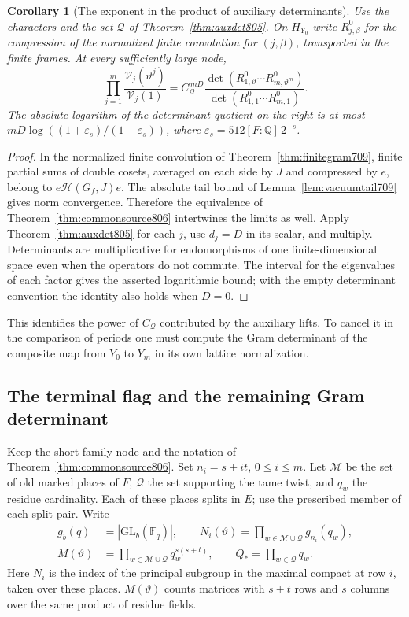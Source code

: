 \documentclass[a4paper,11pt]{article}
\newtheorem{corollary}[proposition]{Corollary}
\theoremstyle{definition}
\theoremstyle{remark}
\numberwithin{equation}{section}
\begin{document}
\begin{corollary}[The exponent in the product of auxiliary determinants]
\leavevmode\label{cor:scalarpower806}
Use the characters and the set \(\mathcal Q\) of
Theorem~\ref{thm:auxdet805}. On \(H_{Y_0}\) write
\(R^0_{j,\beta}\) for the compression of the normalized finite
convolution for \((j,\beta)\), transported in the finite frames.
At every sufficiently large node,
\[
 \prod_{j=1}^m\frac{\mathcal V_j(\vartheta^j)}{\mathcal V_j(1)}
    = C_{\mathcal Q}^{\,mD}
       \frac{\det(R^0_{1,\vartheta}\cdots R^0_{m,\vartheta^m})}
            {\det(R^0_{1,1}\cdots R^0_{m,1})}.
\]
The absolute logarithm of the determinant quotient on the
right is at most
\(mD\log((1+\varepsilon_s)/(1-\varepsilon_s))\), where
\(\varepsilon_s=512[F:\mathbb Q]\,2^{-s}\).
\end{corollary}
\begin{proof}
In the normalized finite convolution of
Theorem~\ref{thm:finitegram709}, finite partial sums of double
cosets, averaged on each side by \(J\) and compressed by \(e\),
belong to \(e\mathcal H(G_f,J)e\). The absolute tail bound of
Lemma~\ref{lem:vacuumtail709} gives norm convergence. Therefore
the equivalence of Theorem~\ref{thm:commonsource806} intertwines
the limits as well. Apply Theorem~\ref{thm:auxdet805} for each
\(j\), use \(d_j=D\) in its scalar, and multiply. Determinants
are multiplicative for endomorphisms of one finite-dimensional
space even when the operators do not commute. The interval for
the eigenvalues of each factor gives the asserted logarithmic
bound; with the empty determinant convention the identity also
holds when \(D=0\).
\end{proof}
This identifies the power of \(C_{\mathcal Q}\) contributed by
the auxiliary lifts. To cancel it in the comparison of periods
one must compute the Gram determinant of the composite map
from \(Y_0\) to \(Y_m\) in its own lattice normalization.
\clearpage

\subsection{The terminal flag and the remaining Gram determinant}
\label{sec:terminalflag807}
Keep the short-family node and the notation of
Theorem~\ref{thm:commonsource806}. Set \(n_i=s+it\), \(0\le i\le m\).
Let \(\mathcal M\) be the set of old marked places of \(F\),
\(\mathcal Q\) the set supporting the tame twist, and \(q_w\) the
residue cardinality. Each of these places splits in \(E\); use the
prescribed member of each split pair. Write
\[
\begin{split}
  g_b(q)&=|\mathrm{GL}_b(\mathbb F_q)|,\qquad
  N_i(\vartheta)=\prod_{w\in\mathcal M\cup\mathcal Q}g_{n_i}(q_w),\\
  M(\vartheta)&=\prod_{w\in\mathcal M\cup\mathcal Q}q_w^{s(s+t)},
  \qquad Q_*=\prod_{w\in\mathcal Q}q_w .
\end{split}
\]
Here \(N_i\) is the index of the principal subgroup in the
maximal compact at row \(i\), taken over these places.
\(M(\vartheta)\) counts matrices with \(s+t\) rows and \(s\)
columns over the same product of residue fields.
\end{document}
